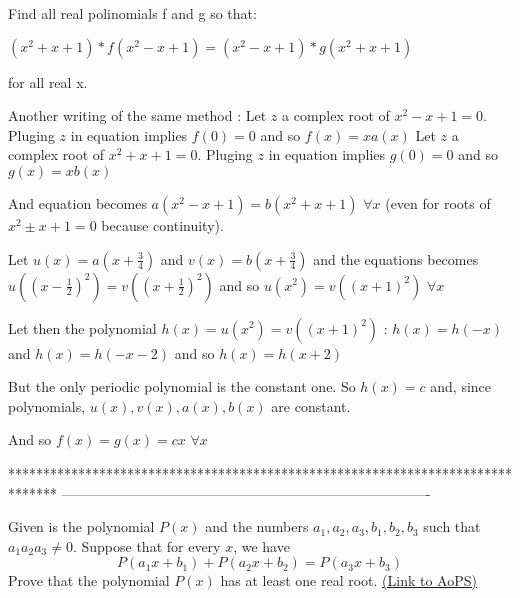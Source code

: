 \begin{solution}
	\begin{tcolorbox}Find all real polinomials f and g so that:

$(x^2+x+1)*f(x^2-x+1)=(x^2-x+1)*g(x^2+x+1)$

for all real x.\end{tcolorbox}
Another writing of the same method :
Let $z$ a complex root of $x^2-x+1=0$. Pluging $z$ in equation implies $f(0)=0$ and so $f(x)=xa(x)$
Let $z$ a complex root of $x^2+x+1=0$. Pluging $z$ in equation implies $g(0)=0$ and so $g(x)=xb(x)$

And equation becomes $a(x^2-x+1)=b(x^2+x+1)$ $\forall x$ (even for roots of $x^2\pm x+1=0$ because continuity).

Let $u(x)=a(x+\frac 34)$ and $v(x)=b(x+\frac 34)$ and the equations becomes $u((x-\frac 12)^2)=v((x+\frac 12)^2)$ and so $u(x^2)=v((x+1)^2)$ $\forall x$

Let then the polynomial $h(x)=u(x^2)=v((x+1)^2)$ : $h(x)=h(-x)$ and $h(x)=h(-x-2)$ and so $h(x)=h(x+2)$ 

But the only periodic polynomial is the constant one. So $h(x)=c$ and, since polynomials, $u(x),v(x),a(x),b(x)$ are constant.

And so $\boxed{f(x)=g(x)=cx}$ $\forall x$
\end{solution}
*******************************************************************************
-------------------------------------------------------------------------------

\begin{problem}
	Given is the polynomial $P(x)$ and the numbers $a_1,a_2,a_3,b_1,b_2,b_3$ such that $a_1a_2a_3\not=0$. Suppose that for every $x$, we have
\[P(a_1x+b_1)+P(a_2x+b_2)=P(a_3x+b_3)\]
Prove that the polynomial $P(x)$ has at least one real root.
	\flushright \href{https://artofproblemsolving.com/community/c6h481894}{(Link to AoPS)}
\end{problem}



